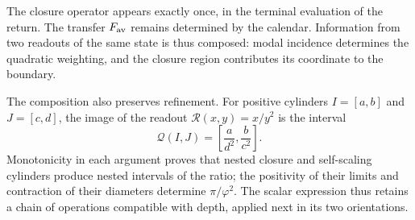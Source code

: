 The closure operator appears exactly once, in the terminal evaluation
of the return. The transfer \(F_{\rm av}\) remains determined
by the calendar. Information from two readouts of the
same state is thus composed: modal incidence determines the quadratic
weighting, and the closure region contributes its coordinate to the boundary.

The composition also preserves refinement. For positive cylinders
\(I=[a,b]\) and \(J=[c,d]\), the image of the readout
\(\mathcal R(x,y)=x/y^2\) is the interval
\[
 \mathcal Q(I,J)=\left[\frac{a}{d^2},\frac{b}{c^2}\right].
\]
Monotonicity in each argument proves that nested closure
and self-scaling cylinders produce nested intervals of the ratio; the
positivity of their limits and contraction of their diameters determine
\(\pi/\varphi^2\). The scalar expression thus retains a chain
of operations compatible with depth, applied
next in its two orientations.
